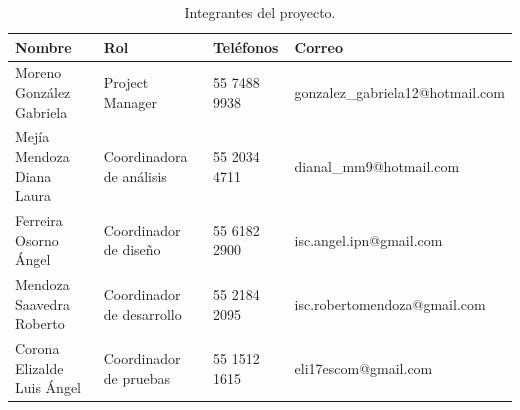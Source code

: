 \begin{table}[hbtp!]
    \noindent\begin{tabular}{|p{}|p{}|p{}|p{}|}
    	\hline
    	{\bf Nombre} & {\bf Rol} & {\bf Teléfonos} & {\bf Correo}\\
    	\hline
	Moreno González Gabriela & Project Manager & 55 7488 9938 & gonzalez\_gabriela12@hotmail.com \\
        	\hline
    	Mejía Mendoza Diana Laura & Coordinadora de análisis & 55 2034 4711 & dianal\_mm9@hotmail.com \\
    	\hline
	Ferreira Osorno Ángel & Coordinador de diseño & 55 6182 2900 & isc.angel.ipn@gmail.com \\
	\hline
	Mendoza Saavedra Roberto & Coordinador de desarrollo & 55 2184 2095 & isc.robertomendoza@gmail.com \\
	\hline
	Corona Elizalde Luis Ángel & Coordinador de pruebas & 55 1512 1615 & eli17escom@gmail.com \\
    \end{tabular}
	\caption{Integrantes del proyecto.}
	\label{tbl:staff}
\end{table}

